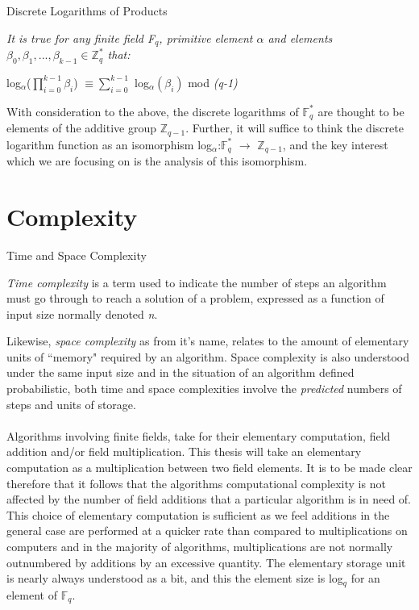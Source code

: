 \documentclass[iwp,first]{luthesis}
\begin{document}
\newpage
\begin{theorem}
Discrete Logarithms of Products
\end{theorem}

\textit{It is true for any finite field F$_q$, primitive element $\alpha$ and elements $\beta_0, \beta_1,...,\beta_{k-1}\in$$\mathbb{Z}^{*}_{q}$ that:}
\begin{center}

log$_\alpha$($\prod\limits_{i=0}^{k-1} \beta_i$) $\equiv \sum\limits_{i=0}^{k-1}$ log$_\alpha (\beta_i)$ mod \textit{(q-1)}
\end{center}

With consideration to the above, the discrete logarithms of $\mathbb{F}^{*}_{q}$ are thought to be elements of the additive group $\mathbb{Z}_{q-1}$. Further, it will suffice to think the discrete logarithm function as an isomorphism log$_\alpha$:$\mathbb{F}^{*}_{q}$ $\longrightarrow$ $\mathbb{Z}_{q-1}$, and the key interest which we are focusing on is the analysis of this isomorphism.

\section{Complexity}

\begin{mydef}
Time and Space Complexity
\end{mydef}

\textit{Time complexity} is a term used to indicate the number of steps an algorithm must go through to reach a solution of a problem, expressed as a function of input size normally denoted \textit{n}.

Likewise, \textit{space complexity} as from it's name, relates to the amount of elementary units of ``memory" required by an algorithm. Space complexity is also understood under the same input size and in the situation of an algorithm defined probabilistic, both time and space complexities involve the \textit{predicted} numbers of steps and units of storage.
\\
\\
Algorithms involving finite fields, take for their elementary computation, field addition and/or field multiplication. This thesis will take an elementary computation as a multiplication between two field elements. It is to be made clear therefore that it follows that the algorithms computational complexity is not affected by the number of field additions that a particular algorithm is in need of. This choice of elementary computation is sufficient as we feel additions in the general case are performed at a quicker rate than compared to multiplications on computers and in the majority of algorithms, multiplications are not normally outnumbered by additions by an excessive quantity. The elementary storage unit is nearly always understood as a bit, and this the element size is log$_q$ for an element of $\mathbb{F}_q$. 
\end{document}
